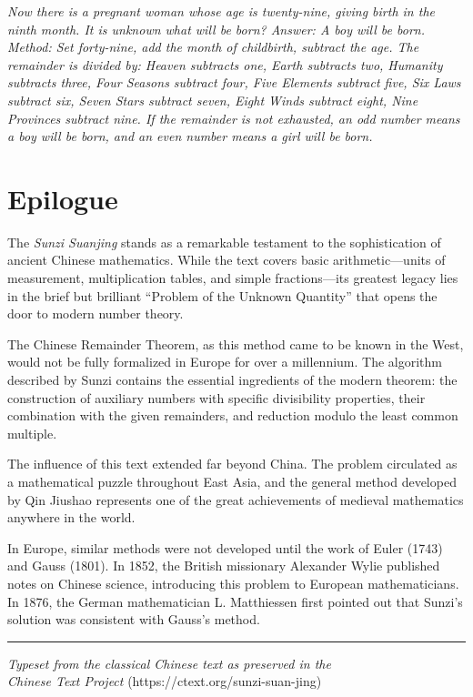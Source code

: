 \documentclass[11pt,a4paper]{article}
\newcommand{\longline}{\noindent\rule{\textwidth}{0.4pt}}
\begin{document}
\textit{Now there is a pregnant woman whose age is twenty-nine, giving birth in the ninth month. It is unknown what will be born? Answer: A boy will be born. Method: Set forty-nine, add the month of childbirth, subtract the age. The remainder is divided by: Heaven subtracts one, Earth subtracts two, Humanity subtracts three, Four Seasons subtract four, Five Elements subtract five, Six Laws subtract six, Seven Stars subtract seven, Eight Winds subtract eight, Nine Provinces subtract nine. If the remainder is not exhausted, an odd number means a boy will be born, and an even number means a girl will be born.}

\newpage

\section*{Epilogue}

The \textit{Sunzi Suanjing} stands as a remarkable testament to the sophistication of ancient Chinese mathematics. While the text covers basic arithmetic---units of measurement, multiplication tables, and simple fractions---its greatest legacy lies in the brief but brilliant ``Problem of the Unknown Quantity'' that opens the door to modern number theory.

The Chinese Remainder Theorem, as this method came to be known in the West, would not be fully formalized in Europe for over a millennium. The algorithm described by Sunzi contains the essential ingredients of the modern theorem: the construction of auxiliary numbers with specific divisibility properties, their combination with the given remainders, and reduction modulo the least common multiple.

The influence of this text extended far beyond China. The problem circulated as a mathematical puzzle throughout East Asia, and the general method developed by Qin Jiushao represents one of the great achievements of medieval mathematics anywhere in the world.

In Europe, similar methods were not developed until the work of Euler (1743) and Gauss (1801). In 1852, the British missionary Alexander Wylie published notes on Chinese science, introducing this problem to European mathematicians. In 1876, the German mathematician L. Matthiessen first pointed out that Sunzi's solution was consistent with Gauss's method.

\vspace{1cm}
\begin{center}
\longline
\end{center}

\vspace{0.5cm}

\begin{center}
\textit{Typeset from the classical Chinese text as preserved in the}\\
\textit{Chinese Text Project} (https://ctext.org/sunzi-suan-jing)
\end{center}
\end{document}
